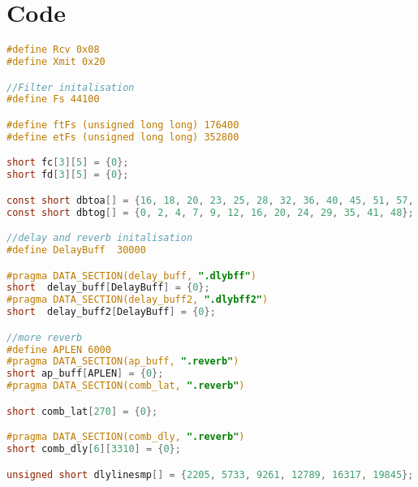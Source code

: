 \chapter{Code}
\label{ap:all_code}

\begin{lstlisting}[caption={Initalisation of data and constants},language=C,label={apcode:init},tabsize=2]
#define Rcv 0x08
#define Xmit 0x20

//Filter initalisation
#define Fs 44100

#define ftFs (unsigned long long) 176400
#define etFs (unsigned long long) 352800

short fc[3][5] = {0};
short fd[3][5] = {0};

const short dbtoa[] = {16, 18, 20, 23, 25, 28, 32, 36, 40, 45, 51, 57, 64};
const short dbtog[] = {0, 2, 4, 7, 9, 12, 16, 20, 24, 29, 35, 41, 48};

//delay and reverb initalisation
#define DelayBuff  30000

#pragma DATA_SECTION(delay_buff, ".dlybff")
short  delay_buff[DelayBuff] = {0};
#pragma DATA_SECTION(delay_buff2, ".dlybff2")
short  delay_buff2[DelayBuff] = {0};

//more reverb
#define APLEN 6000
#pragma DATA_SECTION(ap_buff, ".reverb")
short ap_buff[APLEN] = {0};
#pragma DATA_SECTION(comb_lat, ".reverb")

short comb_lat[270] = {0};

#pragma DATA_SECTION(comb_dly, ".reverb")
short comb_dly[6][3310] = {0};

unsigned short dlylinesmp[] = {2205, 5733, 9261, 12789, 16317, 19845};
\end{lstlisting}

